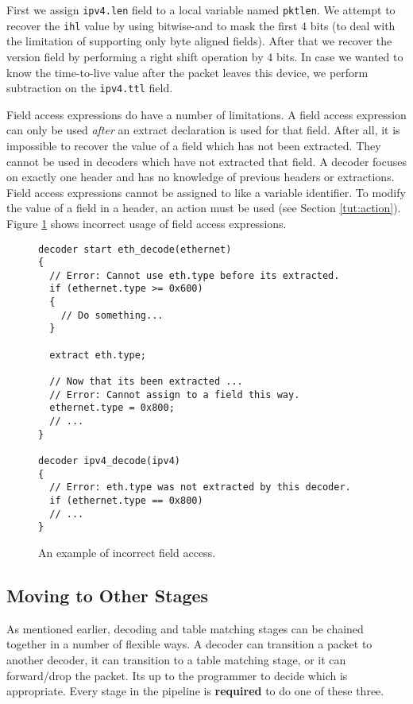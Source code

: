 First we assign \texttt{ipv4.len} field to a local variable named \texttt{pktlen}. We attempt to recover the \texttt{ihl} value by using bitwise-and to mask the first 4 bits (to deal with the limitation of supporting only byte aligned fields). After that we recover the version field by performing a right shift operation by 4 bits. In case we wanted to know the time-to-live value after the packet leaves this device, we perform subtraction on the \texttt{ipv4.ttl} field.

Field access expressions do have a number of limitations. A field access expression can only be used \textit{after} an extract declaration is used for that field. After all, it is impossible to recover the value of a field which has not been extracted. They cannot be used in decoders which have not extracted that field. A decoder focuses on exactly one header and has no knowledge of previous headers or extractions. Field access expressions cannot be assigned to like a variable identifier. To modify the value of a field in a header, an action must be used (see Section \ref{tut:action}). Figure \ref{fg:bad_access_ex} shows incorrect usage of field access expressions.

\begin{figure}[ht]
\begin{lstlisting}
decoder start eth_decode(ethernet)
{
  // Error: Cannot use eth.type before its extracted.
  if (ethernet.type >= 0x600) 
  {
    // Do something...
  }
  
  extract eth.type;
  
  // Now that its been extracted ...
  // Error: Cannot assign to a field this way.
  ethernet.type = 0x800;
  // ...
}

decoder ipv4_decode(ipv4)
{
  // Error: eth.type was not extracted by this decoder.
  if (ethernet.type == 0x800)
  // ...
}
\end{lstlisting}
\caption{An example of incorrect field access.}
\label{fg:bad_access_ex}
\end{figure}

\subsection{Moving to Other Stages} \label{tut:decoder_next}

As mentioned earlier, decoding and table matching stages can be chained together in a number of flexible ways. A decoder can transition a packet to another decoder, it can transition to a table matching stage, or it can forward/drop the packet. Its up to the programmer to decide which is appropriate. Every stage in the pipeline is \textbf{required} to do one of these three.

